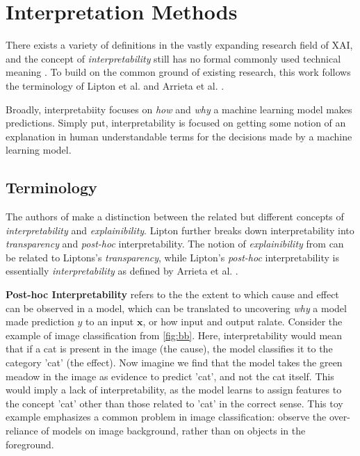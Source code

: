 \documentclass[sigconf]{acmart}
\newcommand{\mypar}[1]{\vspace{0.2cm}\noindent\textbf{#1}}
\begin{document}
% 
\section{Interpretation Methods}
\label{sec:interpretation_methods}

There exists a variety of definitions in the vastly expanding research field of XAI, and the concept of \textit{interpretability} still has no formal commonly used technical meaning \cite{lipton2018mythos}. To build on the common ground of existing research, this work follows the terminology of Lipton et al. \cite{lipton2018mythos} and Arrieta et al. \cite{arrieta2020explainable}.

Broadly, interpretabiity focuses on \textit{how} and \textit{why} a machine learning model makes predictions.
Simply put, interpretability is focused on getting some notion of an explanation in human understandable terms for the decisions made by a machine learning model.

\subsection{Terminology}
\label{subsec:interpretation_methods_terminology}
The authors of \cite{arrieta2020explainable} make a distinction between the related but different concepts of \textit{interpretability} and \textit{explainibility}. Lipton \cite{lipton2018mythos} further breaks down interpretability into \textit{transparency} and \textit{post-hoc} interpretability. The notion of \textit{explainibility} from \cite{arrieta2020explainable} can be related to Liptons's \textit{transparency}, while Lipton's \textit{post-hoc} interpretability is essentially \textit{interpretability} as defined by Arrieta et al. \cite{arrieta2020explainable}.

\mypar{Post-hoc Interpretability} refers to the the extent to which cause and effect can be observed in a model, which can be translated to uncovering \textit{why} a model made prediction $y$ to an input $\mathbf{x}$, or how input and output ralate. Consider the example of image classification from \autoref{fig:bb}. Here, interpretability would mean that if a cat is present in the image (the cause), the model classifies it to the category 'cat' (the effect). Now imagine we find that the model takes the green meadow in the image as evidence to predict 'cat', and not the cat itself. This would imply a lack of interpretability, as the model learns to assign features to the concept 'cat' other than those related to 'cat' in the correct sense. This toy example emphasizes a common problem in image classification: \cite{xiao2020noise} observe the over-reliance of models on image background, rather than on objects in the foreground. 
\end{document}
